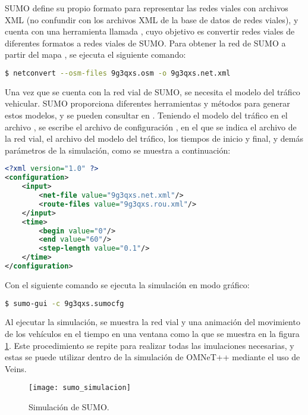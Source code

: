 SUMO define su propio formato para representar las redes viales con archivos
XML (no confundir con los archivos XML de la base de datos de redes viales), y
cuenta con una herramienta llamada , cuyo objetivo es convertir
redes viales de diferentes formatos a redes viales de SUMO. Para obtener la red
de SUMO  a partir del mapa , se ejecuta el
siguiente comando:

\begin{lstlisting}[language=bash]
$ netconvert --osm-files 9g3qxs.osm -o 9g3qxs.net.xml
\end{lstlisting}

Una vez que se cuenta con la red vial de SUMO, se necesita el modelo del tráfico
vehicular. SUMO proporciona diferentes herramientas y métodos para generar
estos modelos, y se pueden consultar en \cite{SUMOTrafico}. Teniendo el modelo
del tráfico en el archivo , se escribe el archivo de
configuración , en el que se indica el archivo de la
red vial, el archivo del modelo del tráfico, los tiempos de inicio y final, y
demás parámetros de la simulación, como se muestra a continuación:

\begin{lstlisting}[language=XML]
<?xml version="1.0" ?>
<configuration>
    <input>
        <net-file value="9g3qxs.net.xml"/>
        <route-files value="9g3qxs.rou.xml"/>
    </input>
    <time>
        <begin value="0"/>
        <end value="60"/>
        <step-length value="0.1"/>
    </time>
</configuration>
\end{lstlisting}

Con el siguiente comando se ejecuta la simulación en modo gráfico:

\begin{lstlisting}[language=bash]
$ sumo-gui -c 9g3qxs.sumocfg
\end{lstlisting}

Al ejecutar la simulación, se muestra la red vial y una animación del
movimiento de los vehículos en el tiempo en una ventana como la que se muestra
en la figura \ref{fig:sumo_simulacion}. Este procedimiento se repite para
realizar todas las imulaciones necesarias, y estas se puede utilizar dentro de
la simulación de OMNeT++ mediante el uso de Veins.

\begin{figure}[th!]
\centering
\texttt{[image: sumo\_simulacion]}
\decoRule
\caption[Simulación de SUMO]{Simulación de SUMO.}
\label{fig:sumo_simulacion}
\end{figure}

